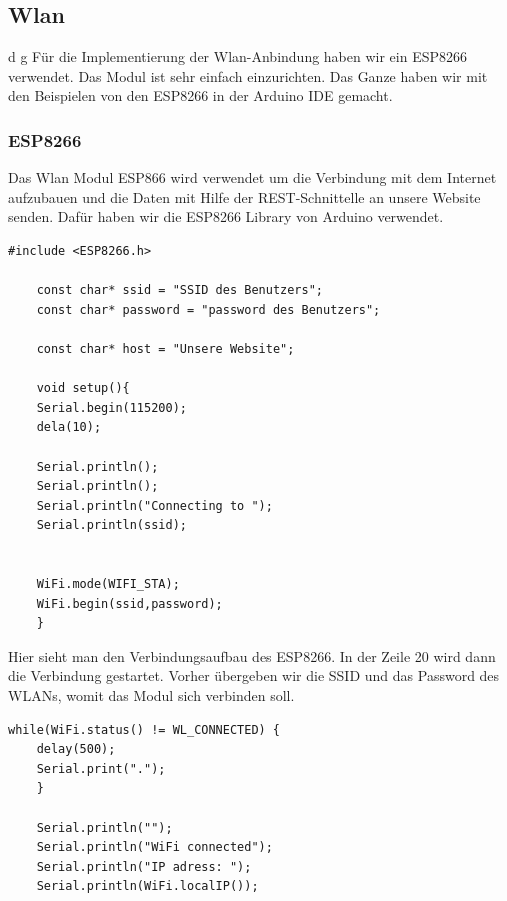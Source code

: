 \newpage
\def \currentAuthor {Florian Tipotsch}
\newpage
\subsection{Wlan}                                                                                                      d  g  Für die Implementierung der Wlan-Anbindung haben wir ein ESP8266 verwendet. Das Modul ist sehr einfach einzurichten. Das Ganze haben wir mit den Beispielen von den ESP8266 in der Arduino IDE gemacht.

\subsubsection{ESP8266}                                                                                             
Das Wlan Modul ESP866 wird verwendet um die Verbindung mit dem Internet aufzubauen und die Daten mit Hilfe der REST-Schnittelle an unsere Website senden. Dafür haben wir die ESP8266 Library von Arduino verwendet.\cite{esp8266}
\begin{lstlisting}[caption=Verbindungsaufbau des ESP8266]
	#include <ESP8266.h>
	
	const char* ssid = "SSID des Benutzers";
	const char* password = "password des Benutzers";
	
	const char* host = "Unsere Website";
	
	void setup(){
	Serial.begin(115200);
	dela(10);
	
	Serial.println();
	Serial.println();
	Serial.println("Connecting to ");
	Serial.println(ssid);
	
	
	WiFi.mode(WIFI_STA);
	WiFi.begin(ssid,password);
	}
\end{lstlisting}
                                                                                                       
Hier sieht man den Verbindungsaufbau des ESP8266. In der Zeile 20 wird dann die Verbindung gestartet. Vorher übergeben wir die SSID und das Password des WLANs, womit das Modul sich verbinden soll.
\newpage
\begin{lstlisting}[caption=Verbindungsaufbau Response]
	while(WiFi.status() != WL_CONNECTED) {
	delay(500);
	Serial.print(".");
	}
	
	Serial.println("");
	Serial.println("WiFi connected");
	Serial.println("IP adress: ");
	Serial.println(WiFi.localIP());
	
	


\end{lstlisting}

